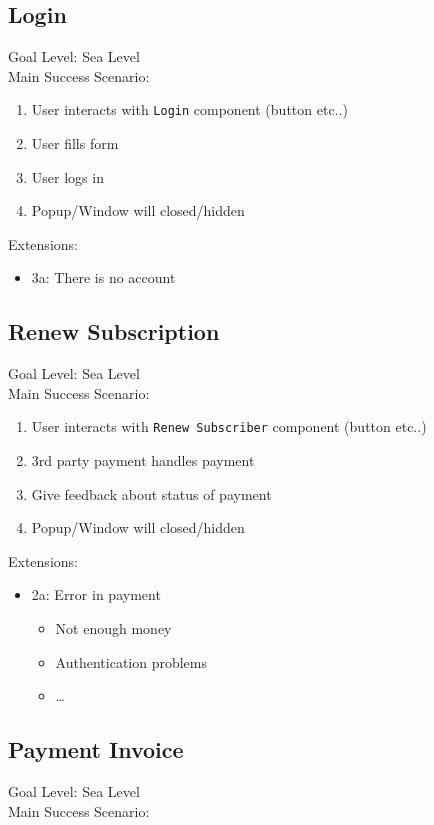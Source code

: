 \documentclass[11pt]{article}
\begin{document}
\subsection{Login}
\label{sec:orgc92bb06}
Goal Level: Sea Level \\
Main Success Scenario: \\

\begin{enumerate}
\item User interacts with \texttt{Login} component (button etc..)
\item User fills form
\item User logs in
\item Popup/Window will closed/hidden
\end{enumerate}

Extensions:
\begin{itemize}
\item 3a: There is no account
\end{itemize}
\subsection{Renew Subscription}
\label{sec:orgdc0067b}
Goal Level: Sea Level \\
Main Success Scenario: 

\begin{enumerate}
\item User interacts with \texttt{Renew Subscriber} component (button etc..)
\item 3rd party payment handles payment
\item Give feedback about status of payment
\item Popup/Window will closed/hidden
\end{enumerate}

Extensions:
\begin{itemize}
\item 2a: Error in payment
\begin{itemize}
\item Not enough money
\item Authentication problems
\item \ldots{}
\end{itemize}
\end{itemize}
\subsection{Payment Invoice}
\label{sec:org7a09bc8}
Goal Level: Sea Level \\
Main Success Scenario: \\
\end{document}
